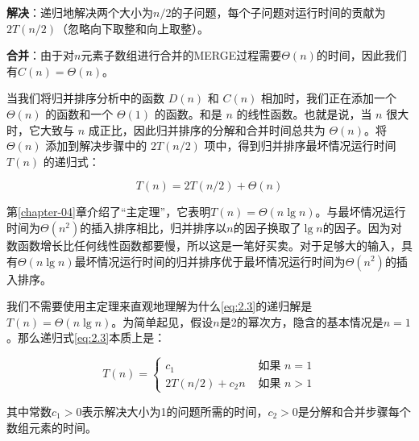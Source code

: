 \documentclass[lang=cn,newtx,10pt,scheme=chinese]{elegantbook}
\begin{document}
\textbf{解决}：递归地解决两个大小为$n/2$的子问题，每个子问题对运行时间的贡献为$2T(n/2)$（忽略向下取整和向上取整）。

\textbf{合并}：由于对$n$元素子数组进行合并的MERGE过程需要$\Theta(n)$的时间，因此我们有$C(n)=\Theta(n)$。

当我们将归并排序分析中的函数 $D(n)$ 和 $C(n)$ 相加时，我们正在添加一个 $\Theta(n)$ 的函数和一个 $\Theta(1)$ 的函数。和是 $n$ 的线性函数。也就是说，当 $n$ 很大时，它大致与 $n$ 成正比，因此归并排序的分解和合并时间总共为 $\Theta(n)$。将 $\Theta(n)$ 添加到解决步骤中的 $2T(n/2)$ 项中，得到归并排序最坏情况运行时间 $T(n)$ 的递归式：

\begin{equation}\label{eq:2.3}
T(n)=2T(n/2)+\Theta(n)
\end{equation}

第\ref{chapter-04}章介绍了``主定理''，它表明$T(n)=\Theta(n\lg{n})$。与最坏情况运行时间为$\Theta(n^2)$的插入排序相比，归并排序以$n$的因子换取了$\lg n$的因子。因为对数函数增长比任何线性函数都要慢，所以这是一笔好买卖。对于足够大的输入，具有$\Theta(n \lg n)$最坏情况运行时间的归并排序优于最坏情况运行时间为$\Theta(n^2)$的插入排序。

我们不需要使用主定理来直观地理解为什么\eqref{eq:2.3}的递归解是$T(n) = \Theta(n \lg n)$。为简单起见，假设$n$是2的幂次方，隐含的基本情况是$n = 1$。那么递归式\eqref{eq:2.3}本质上是：

\begin{equation}\label{eq:2.4}
T(n)= \begin{cases}c_1 & \text { 如果 } n=1 \\ 2 T(n / 2)+c_2 n & \text { 如果 } n>1\end{cases}
\end{equation}

其中常数$c_1 > 0$表示解决大小为1的问题所需的时间，$c_2 > 0$是分解和合并步骤每个数组元素的时间。
\end{document}
